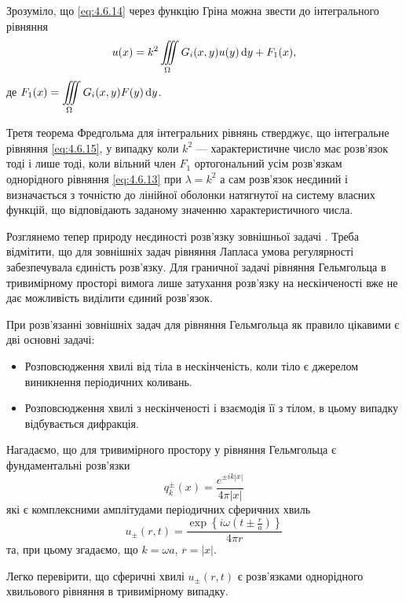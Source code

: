 Зрозуміло, що \eqref{eq:4.6.14} через функцію Гріна  можна звести до інтегрального рівняння
\begin{equation}
	\label{eq:4.6.15}
	u(x) = k^2 \displaystyle\iiint\limits_\Omega G_i(x, y) u(y) \mathop{}\!\mathrm{d} y + F_1(x),
\end{equation}
де $F_1(x) = \displaystyle\iiint\limits_\Omega G_i(x, y) F(y) \mathop{}\!\mathrm{d} y$. \medskip

Третя теорема Фредгольма для інтегральних рівнянь стверджує, що інтегральне рівняння \eqref{eq:4.6.15}, у випадку коли $k^2$ --- характеристичне число має розв'язок тоді і лише тоді, коли вільний член $F_1$ ортогональний усім розв'язкам однорідного рівняння \eqref{eq:4.6.13} при $\lambda = k^2$ а сам розв'язок неєдиний і визначається з точністю до лінійної оболонки натягнутої на систему власних функцій, що відповідають заданому значенню характеристичного числа. \medskip

Розглянемо тепер природу неєдиності розв'язку зовнішньої задачі . Треба відмітити, що для зовнішніх задач рівняння Лапласа умова регулярності забезпечувала єдиність розв'язку. Для граничної задачі рівняння Гельмгольца в тривимірному просторі вимога лише затухання розв'язку на нескінченості вже не дає можливість виділити єдиний розв'язок. \medskip

При розв'язанні зовнішніх задач для рівняння Гельмгольца як правило цікавими є дві основні задачі:
\begin{itemize}
	\item Розповсюдження хвилі від тіла в нескінченість, коли тіло є джерелом виникнення періодичних коливань.
	\item Розповсюдження хвилі з нескінченості і взаємодія її з тілом, в цьому випадку відбувається дифракція.
\end{itemize}

Нагадаємо, що для тривимірного простору у рівняння Гельмгольца є фундаментальні розв'язки 
\begin{equation}
	\label{eq:4.6.16}
	q_k^\pm(x) = \frac{e^{\pm i k |x|}}{4 \pi |x|}
\end{equation}
які є комплексними амплітудами періодичних сферичних хвиль
\begin{equation}
	\label{eq:4.6.17}
	u_\pm(r, t) = \frac{\exp\left\{i \omega \left( t \pm \frac{r}{a} \right)\right\}}{4 \pi r}
\end{equation}
та, при цьому згадаємо, що $k = \omega  a$, $r = |x|$. \medskip

Легко перевірити, що сферичні хвилі $u_\pm(r, t)$ є розв'язками однорідного хвильового рівняння в тривимірному випадку. \medskip

